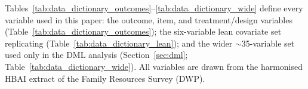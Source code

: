 Tables~\ref{tab:data_dictionary_outcomes}--\ref{tab:data_dictionary_wide} define every variable used in this paper: the outcome, item, and treatment/design variables (Table~\ref{tab:data_dictionary_outcomes}); the six-variable lean covariate set replicating \citet{andersen2025} (Table~\ref{tab:data_dictionary_lean}); and the wider $\sim$35-variable set used only in the DML analysis (Section~\ref{sec:dml}; Table~\ref{tab:data_dictionary_wide}). All variables are drawn from the harmonised HBAI extract of the Family Resources Survey (DWP).


